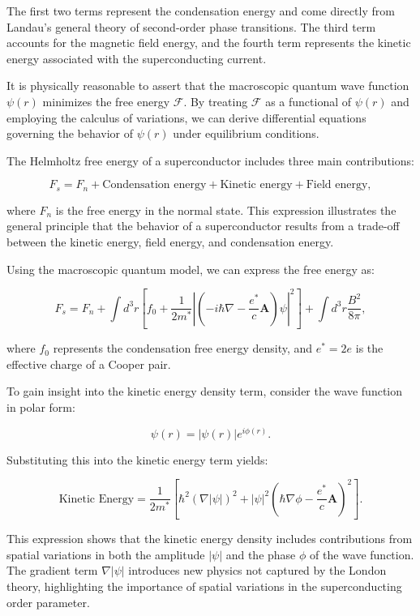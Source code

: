 \documentclass{article}
\begin{document}
The first two terms represent the condensation energy and come directly from Landau's general theory of second-order phase transitions. The third term accounts for the magnetic field energy, and the fourth term represents the kinetic energy associated with the superconducting current.

It is physically reasonable to assert that the macroscopic quantum wave function \(\psi(r)\) minimizes the free energy \(\mathcal{F}\). By treating \(\mathcal{F}\) as a functional of \(\psi(r)\) and employing the calculus of variations, we can derive differential equations governing the behavior of \(\psi(r)\) under equilibrium conditions.

The Helmholtz free energy of a superconductor includes three main contributions:

\[
F_s = F_n + \text{Condensation energy} + \text{Kinetic energy} + \text{Field energy},
\]

where \(F_n\) is the free energy in the normal state. This expression illustrates the general principle that the behavior of a superconductor results from a trade-off between the kinetic energy, field energy, and condensation energy.

Using the macroscopic quantum model, we can express the free energy as:

\[
F_s = F_n + \int d^3r \left[ f_0 + \frac{1}{2m^*} \left| \left( -i \hbar \nabla - \frac{e^*}{c} \mathbf{A} \right) \psi \right|^2 \right] + \int d^3r \frac{B^2}{8\pi},
\]

where \(f_0\) represents the condensation free energy density, and \(e^* = 2e\) is the effective charge of a Cooper pair.

To gain insight into the kinetic energy density term, consider the wave function in polar form:

\[
\psi(r) = |\psi(r)| e^{i \phi(r)}.
\]

Substituting this into the kinetic energy term yields:

\[
\text{Kinetic Energy} = \frac{1}{2m^*} \left[ \hbar^2 (\nabla |\psi|)^2 + |\psi|^2 \left( \hbar \nabla \phi - \frac{e^*}{c} \mathbf{A} \right)^2 \right].
\]

This expression shows that the kinetic energy density includes contributions from spatial variations in both the amplitude \(|\psi|\) and the phase \(\phi\) of the wave function. The gradient term \(\nabla |\psi|\) introduces new physics not captured by the London theory, highlighting the importance of spatial variations in the superconducting order parameter.
\end{document}
